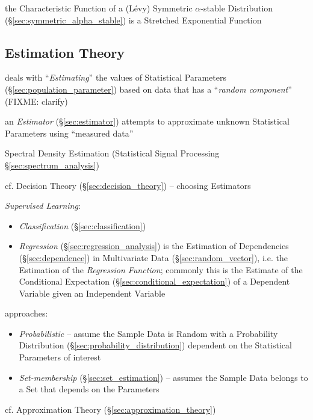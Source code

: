 the Characteristic Function of a (L\'evy) Symmetric $\alpha$-stable Distribution
(\S\ref{sec:symmetric_alpha_stable}) is a Stretched Exponential Function



\subsection{Estimation Theory}\label{sec:estimation_theory}

deals with ``\emph{Estimating}'' the values of Statistical Parameters
(\S\ref{sec:population_parameter}) based on data that has a ``\emph{random
  component}'' (FIXME: clarify)

an \emph{Estimator} (\S\ref{sec:estimator}) attempts to approximate unknown
Statistical Parameters using ``measured data''

\fist Spectral Density Estimation (Statistical Signal Processing
\S\ref{sec:spectrum_analysis})

\fist cf. Decision Theory (\S\ref{sec:decision_theory}) -- choosing Estimators

\fist \emph{Supervised Learning}:
\begin{itemize}
  \item \emph{Classification} (\S\ref{sec:classification})
  \item \emph{Regression} (\S\ref{sec:regression_analysis}) is the Estimation of
    Dependencies (\S\ref{sec:dependence}) in Multivariate Data
    (\S\ref{sec:random_vector}), i.e. the Estimation of the \emph{Regression
      Function}; commonly this is the Estimate of the Conditional Expectation
    (\S\ref{sec:conditional_expectation}) of a Dependent Variable given an
    Independent Variable
\end{itemize}

approaches:
\begin{itemize}
  \item \emph{Probabilistic} -- assume the Sample Data is Random with a
    Probability Distribution (\S\ref{sec:probability_distribution}) dependent on
    the Statistical Parameters of interest
  \item \emph{Set-membership} (\S\ref{sec:set_estimation}) -- assumes the
    Sample Data belongs to a Set that depends on the Parameters
\end{itemize}

\fist cf. Approximation Theory (\S\ref{sec:approximation_theory})

